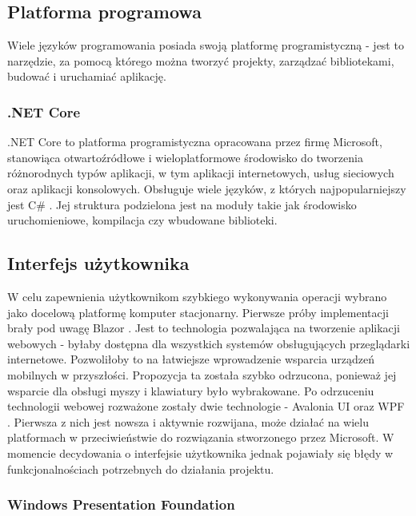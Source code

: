 \subsection{Platforma programowa}

Wiele języków programowania posiada swoją platformę programistyczną - jest to narzędzie, za pomocą którego można tworzyć projekty, zarządzać bibliotekami, budować i uruchamiać aplikację.

\subsubsection{.NET Core}

.NET Core to platforma programistyczna opracowana przez firmę Microsoft, stanowiąca otwartoźródłowe i wieloplatformowe środowisko do tworzenia różnorodnych typów aplikacji, w tym aplikacji internetowych, usług sieciowych oraz aplikacji konsolowych.
Obsługuje wiele języków, z których najpopularniejszy jest C\# \cite{dotnet}.
Jej struktura podzielona jest na moduły takie jak środowisko uruchomieniowe, kompilacja czy wbudowane biblioteki.

\subsection{Interfejs użytkownika}

W celu zapewnienia użytkownikom szybkiego wykonywania operacji wybrano jako docelową platformę komputer stacjonarny.
Pierwsze próby implementacji brały pod uwagę Blazor \cite{blazor}. 
Jest to technologia pozwalająca na tworzenie aplikacji webowych - byłaby dostępna dla wszystkich systemów obsługujących przeglądarki internetowe. 
Pozwoliłoby to na łatwiejsze wprowadzenie wsparcia urządzeń mobilnych w przyszłości. 
Propozycja ta została szybko odrzucona, ponieważ jej wsparcie dla obsługi myszy i klawiatury było wybrakowane. 
Po odrzuceniu technologii webowej rozważone zostały dwie technologie - Avalonia UI \cite{AvaloniaUI} oraz WPF \cite{wpf}.
Pierwsza z nich jest nowsza i aktywnie rozwijana, może działać na wielu platformach w przeciwieństwie do rozwiązania stworzonego przez Microsoft. 
W momencie decydowania o interfejsie użytkownika jednak pojawiały się błędy w funkcjonalnościach potrzebnych do działania projektu.

\subsubsection{Windows Presentation Foundation}

